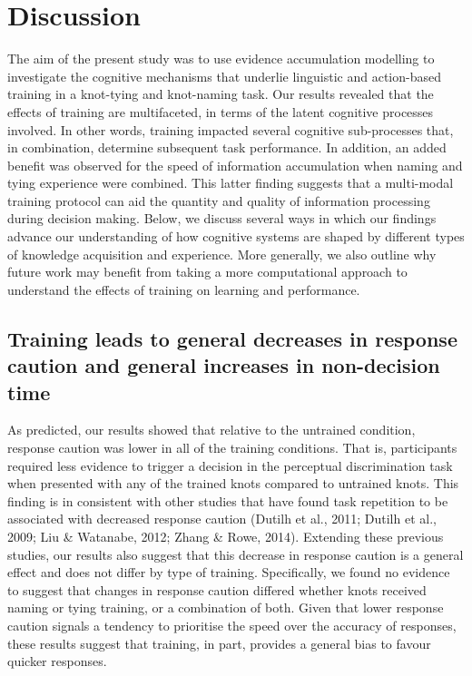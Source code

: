 \documentclass[
  man, donotrepeattitle,floatsintext]{apa6}
\begin{document}
\section{Discussion}\label{discussion}

The aim of the present study was to use evidence accumulation modelling to investigate the cognitive mechanisms that underlie linguistic and action-based training in a knot-tying and knot-naming task. Our results revealed that the effects of training are multifaceted, in terms of the latent cognitive processes involved. In other words, training impacted several cognitive sub-processes that, in combination, determine subsequent task performance. In addition, an added benefit was observed for the speed of information accumulation when naming and tying experience were combined. This latter finding suggests that a multi-modal training protocol can aid the quantity and quality of information processing during decision making. Below, we discuss several ways in which our findings advance our understanding of how cognitive systems are shaped by different types of knowledge acquisition and experience. More generally, we also outline why future work may benefit from taking a more computational approach to understand the effects of training on learning and performance.

\subsection{Training leads to general decreases in response caution and general increases in non-decision time}\label{training-leads-to-general-decreases-in-response-caution-and-general-increases-in-non-decision-time}

As predicted, our results showed that relative to the untrained condition, response caution was lower in all of the training conditions. That is, participants required less evidence to trigger a decision in the perceptual discrimination task when presented with any of the trained knots compared to untrained knots. This finding is in consistent with other studies that have found task repetition to be associated with decreased response caution (Dutilh et al., 2011; Dutilh et al., 2009; Liu \& Watanabe, 2012; Zhang \& Rowe, 2014). Extending these previous studies, our results also suggest that this decrease in response caution is a general effect and does not differ by type of training. Specifically, we found no evidence to suggest that changes in response caution differed whether knots received naming or tying training, or a combination of both. Given that lower response caution signals a tendency to prioritise the speed over the accuracy of responses, these results suggest that training, in part, provides a general bias to favour quicker responses.
\end{document}
